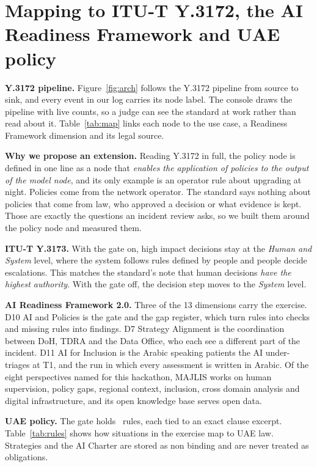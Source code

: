 \documentclass[10pt,twocolumn]{article}
\begin{document}
\section{Mapping to ITU-T Y.3172, the AI Readiness Framework and UAE policy}



\textbf{Y.3172 pipeline.} Figure~\ref{fig:arch} follows the Y.3172 pipeline from source to sink, and every event in our log carries its node label. The console draws the pipeline with live counts, so a judge can see the standard at work rather than read about it. Table~\ref{tab:map} links each node to the use case, a Readiness Framework dimension and its legal source.


\textbf{Why we propose an extension.} Reading Y.3172 in full, the policy node is defined in one line as a node that \emph{enables the application of policies to the output of the model node}, and its only example is an operator rule about upgrading at night. Policies come from the network operator. The standard says nothing about policies that come from law, who approved a decision or what evidence is kept. Those are exactly the questions an incident review asks, so we built them around the policy node and measured them.

\textbf{ITU-T Y.3173.} With the gate on, high impact decisions stay at the \emph{Human and System} level, where the system follows rules defined by people and people decide escalations. This matches the standard's note that human decisions \emph{have the highest authority}. With the gate off, the decision step moves to the \emph{System} level.

\textbf{AI Readiness Framework 2.0.} Three of the 13 dimensions carry the exercise. D10 AI and Policies is the gate and the gap register, which turn rules into checks and missing rules into findings. D7 Strategy Alignment is the coordination between DoH, TDRA and the Data Office, who each see a different part of the incident. D11 AI for Inclusion is the Arabic speaking patients the AI under-triages at T1, and the run in which every assessment is written in Arabic. Of the eight perspectives named for this hackathon, MAJLIS works on human supervision, policy gaps, regional context, inclusion, cross domain analysis and digital infrastructure, and its open knowledge base serves open data.

\textbf{UAE policy.} The gate holds \NRules\ rules, each tied to an exact clause excerpt. Table~\ref{tab:rules} shows how situations in the exercise map to UAE law. Strategies and the AI Charter are stored as non binding and are never treated as obligations.
\end{document}

